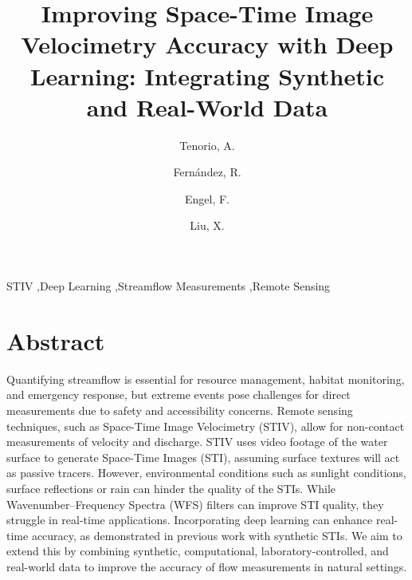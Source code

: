 \documentclass[12pt]{elsarticle}
\begin{document}
\begin{frontmatter}


\title{Improving Space-Time Image Velocimetry Accuracy with Deep Learning: Integrating Synthetic and Real-World Data}

\author[inst1]{Tenorio, A.}
\author[inst1]{Fernández, R.}
\author[inst2]{Engel, F.}
\author[inst1]{Liu, X.}



\begin{keyword}
STIV \sep Deep Learning \sep Streamflow Measurements \sep Remote Sensing
\end{keyword}

\end{frontmatter}

\linenumbers
\section*{Abstract}
Quantifying streamflow is essential for resource management, habitat monitoring, and emergency response, but extreme events pose challenges for direct measurements due to safety and accessibility concerns. Remote sensing techniques, such as Space-Time Image Velocimetry (STIV), allow for non-contact measurements of velocity and discharge. STIV uses video footage of the water surface to generate Space-Time Images (STI), assuming surface textures will act as passive tracers. However, environmental conditions such as sunlight conditions, surface reflections or rain can hinder the quality of the STIs. While Wavenumber–Frequency Spectra (WFS) filters can improve STI quality, they struggle in real-time applications. Incorporating deep learning can enhance real-time accuracy, as demonstrated in previous work with synthetic STIs. We aim to extend this by combining synthetic, computational, laboratory-controlled, and real-world data to improve the accuracy of flow measurements in natural settings.
\end{document}
